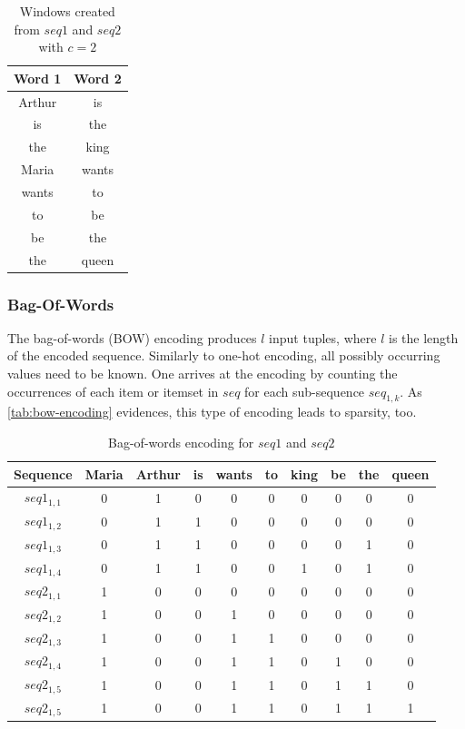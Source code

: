 \begin{table}[ht]
    \centering
    \begin{tabular}{cc}
        Word 1 & Word 2\\
        \hline
        Arthur & is\\
        is & the\\
        the & king\\
        Maria & wants\\
        wants & to\\
        to & be\\
        be & the\\
        the & queen
    \end{tabular}
    \caption{Windows created from $seq1$ and $seq2$ with $c=2$}
    \label{tab:sliding-window}
\end{table}

\subsubsection*{Bag-Of-Words}
The bag-of-words (BOW) encoding produces $l$ input tuples, where $l$ is the length of the encoded sequence. Similarly to one-hot encoding, all possibly occurring values need to be known. One arrives at the encoding by counting the occurrences of each item or itemset in $seq$ for each sub-sequence $seq_{1,k}$. As \autoref{tab:bow-encoding} evidences, this type of encoding leads to sparsity, too.

\begin{table}[]
    \centering
    \begin{tabular}{c|ccccccccc}
        Sequence & Maria & Arthur & is & wants & to & king & be & the & queen\\
        \hline
        $seq1_{1,1}$ & 0 & 1 & 0 & 0 & 0 & 0 & 0 & 0 & 0\\
        $seq1_{1,2}$ & 0 & 1 & 1 & 0 & 0 & 0 & 0 & 0 & 0\\
        $seq1_{1,3}$ & 0 & 1 & 1 & 0 & 0 & 0 & 0 & 1 & 0\\
        $seq1_{1,4}$ & 0 & 1 & 1 & 0 & 0 & 1 & 0 & 1 & 0\\
        \hline
        $seq2_{1,1}$ & 1 & 0 & 0 & 0 & 0 & 0 & 0 & 0 & 0\\
        $seq2_{1,2}$ & 1 & 0 & 0 & 1 & 0 & 0 & 0 & 0 & 0\\
        $seq2_{1,3}$ & 1 & 0 & 0 & 1 & 1 & 0 & 0 & 0 & 0\\
        $seq2_{1,4}$ & 1 & 0 & 0 & 1 & 1 & 0 & 1 & 0 & 0\\
        $seq2_{1,5}$ & 1 & 0 & 0 & 1 & 1 & 0 & 1 & 1 & 0\\
        $seq2_{1,5}$ & 1 & 0 & 0 & 1 & 1 & 0 & 1 & 1 & 1\\
    \end{tabular}
    \caption{Bag-of-words encoding for $seq1$ and $seq2$}
    \label{tab:bow-encoding}
\end{table}
